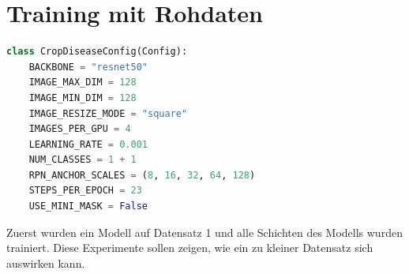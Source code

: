 \section{Training mit Rohdaten}\label{sub:sub:sec:experiment-1}

\begin{lstlisting}[language=python,caption={Konfiguration für Experimente 1},captionpos=b]
class CropDiseaseConfig(Config):
    BACKBONE = "resnet50"
    IMAGE_MAX_DIM = 128
    IMAGE_MIN_DIM = 128
    IMAGE_RESIZE_MODE = "square"
    IMAGES_PER_GPU = 4
    LEARNING_RATE = 0.001
    NUM_CLASSES = 1 + 1
    RPN_ANCHOR_SCALES = (8, 16, 32, 64, 128)
    STEPS_PER_EPOCH = 23
    USE_MINI_MASK = False
\end{lstlisting}
\noindent
Zuerst wurden ein Modell auf Datensatz 1 und alle Schichten des Modells wurden trainiert. Diese Experimente sollen zeigen, wie ein zu kleiner Datensatz sich auswirken kann.

